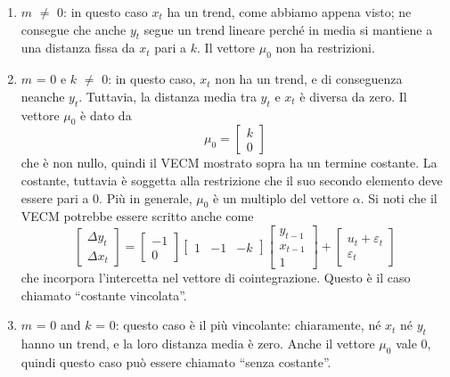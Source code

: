 \begin{enumerate}
\item $m$ $\ne$ 0: in questo caso $x_t$ ha un trend, come abbiamo appena
  visto; ne consegue che anche $y_t$ segue un trend lineare perché in
  media si mantiene a una distanza fissa da $x_t$ pari a $k$.  Il vettore
  $\mu_0$ non ha restrizioni.
	
\item $m$ = 0 e $k$ $\ne$ 0: in questo caso, $x_t$ non ha un trend, e di
  conseguenza neanche $y_t$.  Tuttavia, la distanza media tra $y_t$ e
  $x_t$ è diversa da zero. Il vettore $\mu_0$ è dato da
%	  
  \[
  \mu_0 = \left[ \begin{array}{c} k \\ 0 \end{array} \right]
  \]
%	    
  che è non nullo, quindi il VECM mostrato sopra ha un termine
  costante.  La costante, tuttavia è soggetta alla restrizione che il
  suo secondo elemento deve essere pari a 0. Più in generale,
  $\mu_0$ è un multiplo del vettore $\alpha$. Si noti
  che il VECM potrebbe essere scritto anche come
%	  
  \[
  \left[ \begin{array}{c} \Delta y_t \\ \Delta x_t \end{array} \right]
  = \left[ \begin{array}{r} -1 \\ 0 \end{array} \right] \left[
    \begin{array}{rrr} 1 & -1 & -k \end{array} \right] \left[
    \begin{array}{c} y_{t-1} \\ x_{t-1} \\ 1 \end{array} \right] +
  \left[ \begin{array}{c} u_t + \varepsilon_t \\ \varepsilon_t
    \end{array} \right]
  \]
%	   
  che incorpora l'intercetta nel vettore di cointegrazione. Questo è
  il caso chiamato ``costante vincolata''.
	
\item $m$ = 0 and $k$ = 0: questo caso è il più vincolante: chiaramente,
  né $x_t$ né $y_t$ hanno un trend, e la loro distanza media è zero.
  Anche il vettore $\mu_0$ vale 0, quindi questo caso può essere
  chiamato ``senza costante''.

\end{enumerate}

